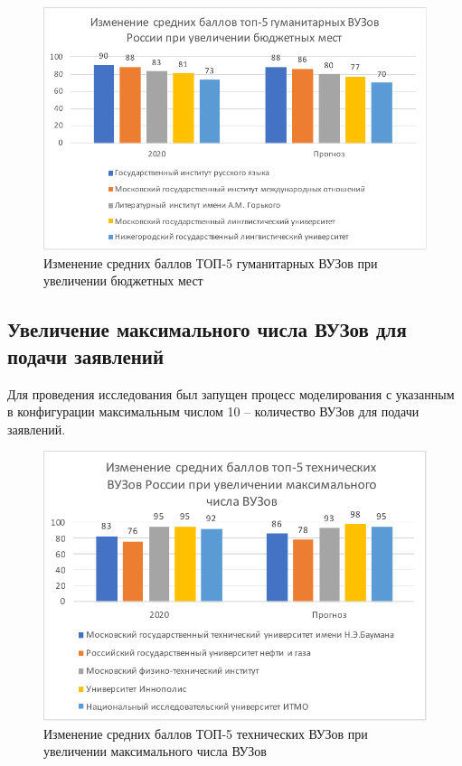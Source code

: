 \begin{figure}[hbtp]
	\centering
	\includegraphics[scale=1.0]{img/top5gymup.pdf.pdf}
	\caption{Изменение средних баллов ТОП-5 гуманитарных ВУЗов при увеличении бюджетных мест}
	\label{top5gymup}
\end{figure} 	

\subsection{Увеличение максимального числа ВУЗов для подачи заявлений}

Для проведения исследования был запущен процесс моделирования с указанным в конфигурации максимальным числом 10 – количество ВУЗов для подачи заявлений.

\begin{figure}[hbtp]
	\centering
	\includegraphics[scale=1.0]{img/top5techmax.pdf.pdf}
	\caption{Изменение средних баллов ТОП-5 технических ВУЗов при увеличении максимального числа ВУЗов}
	\label{top5techmax}
\end{figure} 

